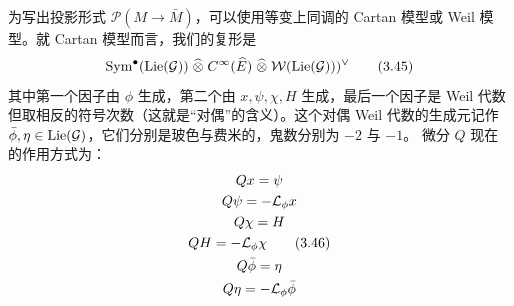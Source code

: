 为写出投影形式 $\mathcal P(M\to\bar M)$，可以使用等变上同调的 Cartan 模型或 Weil
模型。就 Cartan 模型而言，我们的复形是
\begin{equation}
\operatorname{Sym}^{\bullet}(\operatorname{Lie}(\mathcal G))\;\widehat\otimes\;
C^{\infty}(\widehat E)\;\widehat\otimes\;
\mathcal W(\operatorname{Lie}(\mathcal G)))^{\vee}
\tag{3.45}
\end{equation}
其中第一个因子由 $\phi$ 生成，第二个由 $x,\psi,\chi,H$ 生成，最后一个因子是 Weil
代数但取相反的符号次数（这就是“对偶”的含义）。这个对偶 Weil 代数的生成元记作
$\bar\phi,\eta\in\operatorname{Lie}(\mathcal G)$，它们分别是玻色与费米的，鬼数分别为 $-2$ 与 $-1$。
微分 $Q$ 现在的作用方式为：
\begin{gather}
Qx = \psi \notag\\
Q\psi = -\mathcal L_{\phi}x \notag\\
Q\chi = H \notag\\
QH = -\mathcal L_{\phi}\chi \tag{3.46}\\
Q\bar\phi = \eta \notag\\
Q\eta = -\mathcal L_{\phi}\bar\phi \notag
\end{gather}

